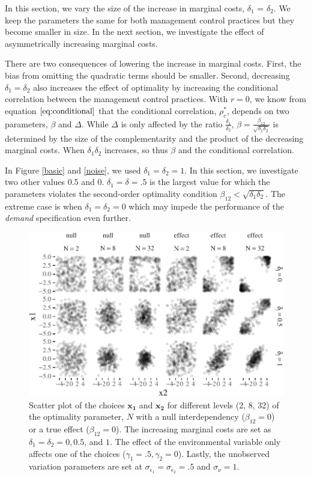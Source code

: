\documentclass[12pt]{article}
\begin{document}
In this section, we vary the size of the increase in marginal costs,
\(\delta_1\) = \(\delta_2\). We keep the parameters the same for both
management control practices but they become smaller in size. In the
next section, we investigate the effect of asymmetrically increasing
marginal costs.

There are two consequences of lowering the increase in marginal costs.
First, the bias from omitting the quadratic terms should be smaller.
Second, decreasing \(\delta_1 = \delta_2\) also increases the effect of
optimality by increasing the conditional correlation between the
management control practices. With \(r=0\), we know from equation
\(\eqref{eq:conditional}\) that the conditional correlation,
\(\rho^*_c\), depends on two parameters, \(\beta\) and \(\Delta\). While
\(\Delta\) is only affected by the ratio \(\frac{\delta_1}{\delta_2}\),
\(\beta = \frac{\beta_{12}}{\sqrt{\delta_1 \delta_2}}\) is determined by
the size of the complementarity and the product of the decreasing
marginal costs. When \(\delta_1 \delta_2\) increases, so thus \(\beta\)
and the conditional correlation.

In Figure \ref{basic} and \ref{noise}, we used
\(\delta_1 = \delta_2 = 1\). In this section, we investigate two other
values 0.5 and 0. \(\delta_1 = \delta = .5\) is the largest value for
which the parameters violates the second-order optimality condition
\(\beta_{12} < \sqrt{\delta_1 \delta_2}\). The extreme case is when
\(\delta_1 = \delta_2 = 0\) which may impede the performance of the
\emph{demand} specification even further.

\begin{figure}

\includegraphics[width=500px]{figure-latex/scatterplot-delta-1}
\caption[Error Rate and Power with Different Levels of Marginal
Costs]{\label{scatter-delta} Scatter plot of the choices $\mathbf{x_1}$ and
$\mathbf{x_2}$ for different levels (2, 8, 32) of the optimality parameter, $N$
with a null interdependency ($\beta_{12} = 0$) or a true effect ($\beta_{12} =
0$). The increasing marginal costs are set as $\delta_1 = \delta_2 = 0, 0.5$,
and $1$. The effect of the environmental variable only affects one of the
choices ($\gamma_1 = .5, \gamma_2 = 0$). Lastly, the unobserved variation
parameters are set at $\sigma_{\epsilon_1} = \sigma_{\epsilon_2} = .5$ and
$\sigma_{\nu} = 1.$ }
\end{figure}
\end{document}
